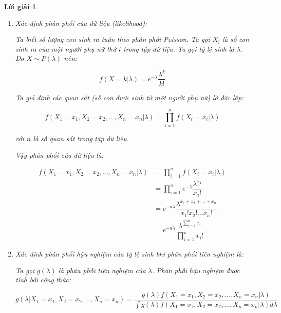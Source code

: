 \documentclass[14pt, a4paper]{article}
\theoremstyle{sltheorem}
\theoremstyle{soltheorem}
\newtheorem*{loigiai}{Lời giải}
\begin{document}
\begin{loigiai}
    \begin{enumerate}
        \item Xác định phân phối của dữ liệu (likelihood):
        
        Ta biết số lượng con sinh ra tuân theo phân phối Poisson.
        Ta gọi $X_i$ là số con sinh ra của một người phụ nữ thứ $i$ trong tập dữ liệu.
        Ta gọi tỷ lệ sinh là $\lambda$.
        Do $X \sim P(\lambda)$ nên:

        \begin{equation*}
            f(X=k \vert \lambda) = e^{-\lambda} \dfrac{\lambda^k}{k!}
        \end{equation*}

        Ta giả định các quan sát (số con được sinh từ một người phụ nữ) là độc lập:

        \begin{equation*}
            f(X_1=x_1,X_2=x_2,\dots, X_n=x_n \vert \lambda) = \prod_{i=1}^n f(X_i = x_i \vert \lambda)
        \end{equation*}

        với $n$ là số quan sát trong tập dữ liệu.

        Vậy phân phối của dữ liệu là:

        \begin{equation*}
            \begin{aligned}
                f(X_1=x_1,X_2=x_2,\dots, X_n=x_n \vert \lambda) &= \prod_{i=1}^n f(X_i = x_i \vert \lambda) \\
                &= \prod_{i=1}^n e^{-\lambda} \dfrac{\lambda^{x_1}}{x_1!} \\
                &= e^{-n\lambda} \dfrac{\lambda^{x_1 + x_2 + \dots + x_n}}{x_1! x_2! \dots x_n!} \\
                &= e^{-n\lambda} \dfrac{\lambda^{\sum_{i=1}^n x_i}}{\prod_{i=1}^n x_i!}
            \end{aligned}
        \end{equation*}

        \item Xác định phân phối hậu nghiệm của tỷ lệ sinh khi phân phối tiên nghiệm là:

        Ta gọi $g(\lambda)$ là phân phối tiên nghiệm của $\lambda$.
        Phân phối hậu nghiệm được tính bởi công thức:

        \begin{equation*}
            g(\lambda \vert X_1 =x_1, X_2=x_2, \dots, X_n=x_n) = \dfrac{g(\lambda) f(X_1=x_1,X_2=x_2,\dots, X_n=x_n \vert \lambda)}{\int g(\lambda) f(X_1=x_1,X_2=x_2,\dots, X_n=x_n \vert \lambda) d \lambda}
        \end{equation*}


\end{enumerate}
\end{loigiai}
\end{document}
